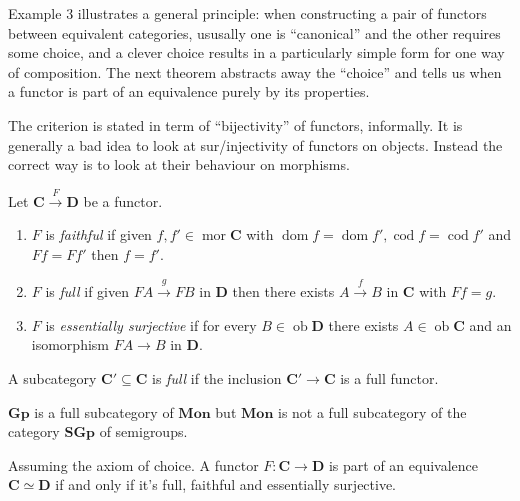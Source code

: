 \documentclass[a4paper]{article}
\renewcommand{\c}[1]{\mathbf{#1}}
\DeclareMathOperator{\ob}{ob}
\DeclareMathOperator{\mor}{mor}
\DeclareMathOperator{\dom}{dom}
\DeclareMathOperator{\cod}{cod}
\begin{document}
Example 3 illustrates a general principle: when constructing a pair of functors between equivalent categories, ususally one is ``canonical'' and the other requires some choice, and a clever choice results in a particularly simple form for one way of composition. The next theorem abstracts away the ``choice'' and tells us when a functor is part of an equivalence purely by its properties.

The criterion is stated in term of ``bijectivity'' of functors, informally. It is generally a bad idea to look at sur/injectivity of functors on objects. Instead the correct way is to look at their behaviour on morphisms.

\begin{definition}
  Let \(\c C \xrightarrow{F} \c D\) be a functor.
  \begin{enumerate}
  \item \(F\) is \emph{faithful} if given \(f, f' \in \mor \c C\) with \(\dom f = \dom f', \cod f = \cod f'\) and \(Ff = Ff'\) then \(f = f'\). 
  \item \(F\) is \emph{full} if given \(FA \xrightarrow{g} FB\) in \(\c D\) then there exists \(A \xrightarrow{f} B\) in \(\c C\) with \(Ff = g\).
  \item \(F\) is \emph{essentially surjective} if for every \(B \in \ob \c D\) there exists \(A \in \ob \c C\) and an isomorphism \(FA \to B\) in \(\c D\).
  \end{enumerate}
\end{definition}

\begin{definition}
  A subcategory \(\c C' \subseteq \c C\) is \emph{full} if the inclusion \(\c C' \to \c C\) is a full functor.
\end{definition}

\begin{eg}
  \(\c{Gp}\) is a full subcategory of \(\c{Mon}\) but \(\c{Mon}\) is not a full subcategory of the category \(\c{SGp}\) of semigroups.
\end{eg}

\begin{lemma}
  Assuming the axiom of choice. A functor \(F: \c C \to \c D\) is part of an equivalence \(\c C \simeq \c D\) if and only if it's full, faithful and essentially surjective.
\end{lemma}
\end{document}
